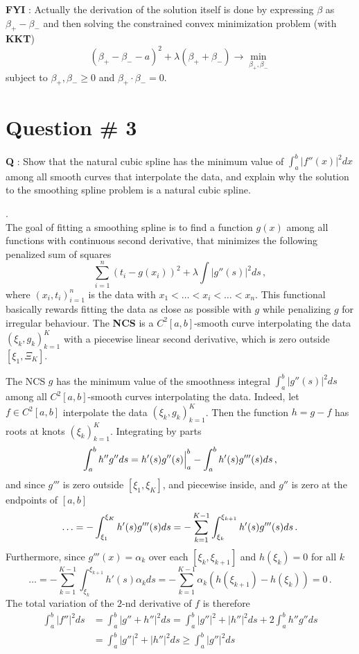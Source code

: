 \documentclass[a4paper]{article}
\begin{document}
\noindent\textbf{FYI} : Actually the derivation of the solution itself is done
by expressing $\beta$ as $\beta_+-\beta_-$ and then solving the constrained convex
minimization problem (with \textbf{KKT})
\[ (\beta_+ - \beta_- - a )^2 + \lambda (\beta_+ + \beta_-) \to \min_{\beta_+,\beta_-}\]
subject to $\beta_+, \beta_-\geq 0$ and $\beta_+ \cdot \beta_-=0$.

\clearpage

\section{Question \# 3} %
\label{sec:question_3}
\textbf{\large \textbf{Q}} : Show that the natural cubic spline has the minimum
value of $\int_a^b |f''(x)|^2 dx$ among all smooth curves that interpolate the
data, and explain why the solution to the smoothing spline problem is a natural
cubic spline.

 .\hfill\\
The goal of fitting a smoothing spline is to find a function $g(x)$ among all
functions with continuous second derivative, that minimizes the following penalized
sum of squares
\[ \sum_{i=1}^n (t_i - g(x_i))^2 + \lambda \int |g''(s)|^2 ds \,, \]
where $(x_i,t_i)_{i=1}^n$ is the data with $x_1<\ldots<x_i<\ldots<x_n$.
This functional basically rewards fitting the data as close as possible with $g$
while penalizing $g$ for irregular behaviour. The \textbf{NCS} is a $C^2[a,b]$-smooth
curve interpolating the data $(\xi_k, g_k)_{k=1}^K$ with a piecewise linear second
derivative, which is zero outside $[\xi_1,\Xi_K]$.

The NCS $g$ has the minimum value of the smoothness integral $\int_a^b |g''(s)|^2 ds$
among all $C^2[a,b]$-smooth curves interpolating the data. Indeed, let $f\in C^2[a,b]$
interpolate the data $(\xi_k, g_k)_{k=1}^K$. Then the function $h = g - f$ has roots
at knots $(\xi_k)_{k=1}^K$. Integrating by parts
\[
\int_a^b h'' g'' ds
= \Bigl. h'(s) g''(s)\Bigr\rvert_a^b - \int_a^b h'(s) g'''(s) ds \,,
\]
and since $g'''$ is zero outside $[\xi_1, \xi_K]$, and piecewise inside, and
$g''$ is zero at the endpoints of $[a,b]$
\[
\ldots
= - \int_{\xi_1}^{\xi_K} h'(s) g'''(s) ds \\
= - \sum_{k=1}^{K-1} \int_{\xi_k}^{\xi_{k+1}} h'(s) g'''(s) ds \,.
\]
Furthermore, since $g'''(x) = \alpha_k$ over each $[\xi_k,\xi_{k+1}]$ and $h(\xi_k)=0$
for all $k$
\[
\ldots
= - \sum_{k=1}^{K-1} \int_{\xi_k}^{\xi_{k+1}} h'(s) \alpha_k ds
= - \sum_{k=1}^{K-1} \alpha_k (h(\xi_{k+1})-h(\xi_k)) = 0\,.
\]
The total variation of the $2$-nd derivative of $f$ is therefore
\begin{align*}
	\int_a^b |f''|^2 ds
	&= \int_a^b \bigl|g'' + h''\bigr|^2 ds
	= \int_a^b |g''|^2 + |h''|^2 ds + 2 \int_a^b h'' g'' ds\\
	&= \int_a^b |g''|^2 + |h''|^2 ds \geq \int_a^b |g''|^2 ds
\end{align*}
\end{document}
